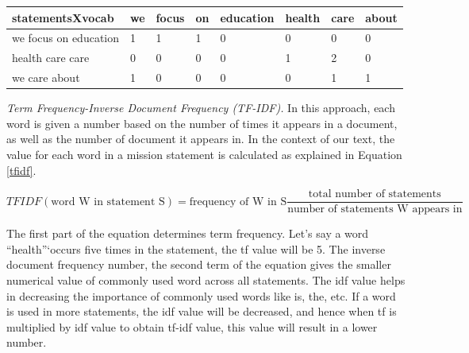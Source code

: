 \documentclass[12pt]{article}
\begin{document}
\begin{tabular}{ | m{3.9cm} | m{0.9cm}| m{1cm} | m{0.9cm}| m{1.3cm} |m{1cm}| m{1cm} |m{0.8cm} } 
\label{count_vector}
    \hline
    statementsXvocab & we & focus & on & education & health & care & about \\
    \hline
    we focus on education & 1 & 1 & 1 & 0 & 0 & 0 & 0\\ 
    \hline
    health care care  & 0 & 0 & 0 & 0 & 1 & 2 & 0 \\ 
    \hline
    we care about & 1 & 0 & 0 & 0 & 0 & 1 & 1 \\ 
    \hline
\end{tabular}

\textit{Term Frequency-Inverse Document Frequency (TF-IDF).} 
In this approach, each word is given a number based on the number of times it appears in a document, as well as the number of document it appears in. In the context of our text, the value for each word in a mission statement is calculated as explained in Equation \ref{tfidf}.

\begin{equation} \label{tfidf}
 TFIDF(\textrm{word W in statement S}) = {\textrm{frequency of W in S}} \frac{\textrm{total number of statements}}{\textrm{number of statements W appears in}} 
\end{equation}

The first part of the equation determines term frequency. Let's say a word ``health''`occurs five times in the statement, the tf value will be 5. The inverse document frequency number, the second term of the equation gives the smaller numerical value of commonly used word across all statements. The idf value helps in decreasing the importance of commonly used words like is, the, etc. If a word is used in more statements, the idf value will be decreased, and hence when tf is multiplied by idf value to obtain tf-idf value, this value will result in a lower number.
\end{document}
